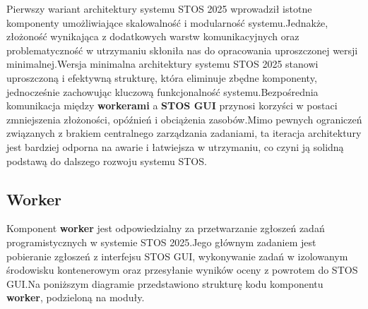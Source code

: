 \documentclass[12pt,a4paper]{article}
\begin{document}
Pierwszy wariant architektury systemu STOS 2025 wprowadził istotne komponenty umożliwiające skalowalność i modularność systemu.\@ Jednakże, złożoność wynikająca z dodatkowych warstw komunikacyjnych oraz problematyczność w utrzymaniu skłoniła nas do opracowania uproszczonej wersji minimalnej.\@ Wersja minimalna architektury systemu STOS 2025 stanowi uproszczoną i efektywną strukturę, która eliminuje zbędne komponenty, jednocześnie zachowując kluczową funkcjonalność systemu.\@ Bezpośrednia komunikacja między \textbf{workerami} a \textbf{STOS GUI} przynosi korzyści w postaci zmniejszenia złożoności, opóźnień i obciążenia zasobów.\@ Mimo pewnych ograniczeń związanych z brakiem centralnego zarządzania zadaniami, ta iteracja architektury jest bardziej odporna na awarie i łatwiejsza w utrzymaniu, co czyni ją solidną podstawą do dalszego rozwoju systemu STOS.\@


































\newpage
\subsection{Worker}
Komponent \textbf{worker} jest odpowiedzialny za przetwarzanie zgłoszeń zadań programistycznych w systemie STOS 2025.\@ Jego głównym zadaniem jest pobieranie zgłoszeń z interfejsu STOS GUI, wykonywanie zadań w izolowanym środowisku kontenerowym oraz przesyłanie wyników oceny z powrotem do STOS GUI.\@ Na poniższym diagramie przedstawiono strukturę kodu komponentu \textbf{worker}, podzieloną na moduły.
\end{document}
